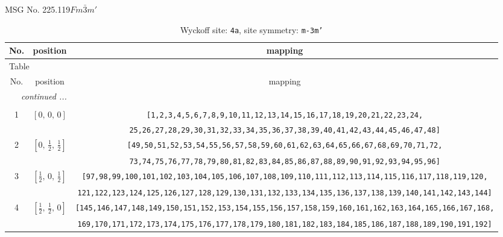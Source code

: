 \documentclass[fleqn,8pt]{jsarticle}
\begin{document}
\setcounter{MaxMatrixCols}{32}

\renewcommand{\tablename}{Table~}
\renewcommand{\figurename}{Figure~}
\begin{center}
\LARGE
MSG No. 225.119\quad$Fm\bar{3}m'$
\end{center}
\renewcommand{\arraystretch}{1.2}
\begin{longtable}{ccc}
\caption{Wyckoff site: {\tt 4a}, site symmetry: {\tt m-3m'}}
 \\
 \hline \hline
No. & position & mapping \\ \hline \endfirsthead

\multicolumn{2}{l}{\tablename\ \thetable{}} \\
 \hline \hline
No. & position & mapping \\ \hline \endhead

 \hline \hline
\multicolumn{2}{r}{\footnotesize\it continued ...} \\ \endfoot

 \hline \hline
\multicolumn{2}{r}{} \\ \endlastfoot

1 & $\left[ 0,\, 0,\, 0 \right]$ & {\tt [1,2,3,4,5,6,7,8,9,10,11,12,13,14,15,16,17,18,19,20,21,22,23,24,} \\ \hline
 &  & {\tt 25,26,27,28,29,30,31,32,33,34,35,36,37,38,39,40,41,42,43,44,45,46,47,48]} \\ \hline
2 & $\left[ 0,\, \frac{1}{2},\, \frac{1}{2} \right]$ & {\tt [49,50,51,52,53,54,55,56,57,58,59,60,61,62,63,64,65,66,67,68,69,70,71,72,} \\ \hline
 &  & {\tt 73,74,75,76,77,78,79,80,81,82,83,84,85,86,87,88,89,90,91,92,93,94,95,96]} \\ \hline
3 & $\left[ \frac{1}{2},\, 0,\, \frac{1}{2} \right]$ & {\tt [97,98,99,100,101,102,103,104,105,106,107,108,109,110,111,112,113,114,115,116,117,118,119,120,} \\ \hline
 &  & {\tt 121,122,123,124,125,126,127,128,129,130,131,132,133,134,135,136,137,138,139,140,141,142,143,144]} \\ \hline
4 & $\left[ \frac{1}{2},\, \frac{1}{2},\, 0 \right]$ & {\tt [145,146,147,148,149,150,151,152,153,154,155,156,157,158,159,160,161,162,163,164,165,166,167,168,} \\ \hline
 &  & {\tt 169,170,171,172,173,174,175,176,177,178,179,180,181,182,183,184,185,186,187,188,189,190,191,192]} \\
\end{longtable}
\renewcommand{\arraystretch}{1.2}
\end{document}
